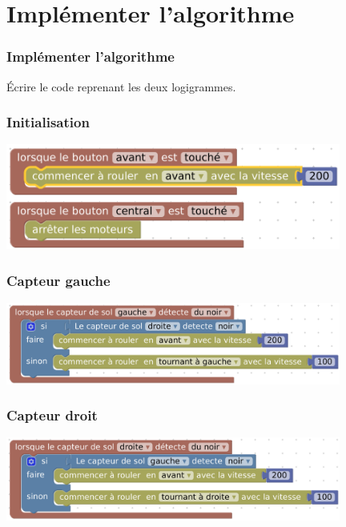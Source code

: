 \documentclass[svgnames,11pt]{beamer}
\begin{document}
\section{Implémenter l'algorithme}
\begin{frame}
    \frametitle{Implémenter l'algorithme}

    \begin{aretenir}[Question]
    Écrire le code reprenant les deux logigrammes.
    \end{aretenir}
\end{frame}
\begin{frame}
    \frametitle{Initialisation}

    \begin{center}
    \centering
    \includegraphics[width=11cm]{ressources/init.png}
    \end{center}

\end{frame}
\begin{frame}
    \frametitle{Capteur gauche}

    \begin{center}
    \centering
    \includegraphics[width=11cm]{ressources/gauche.png}
    \end{center}

\end{frame}
\begin{frame}
    \frametitle{Capteur droit}

    \begin{center}
    \centering
    \includegraphics[width=11cm]{ressources/droite.png}
    \end{center}

\end{frame}
\end{document}
